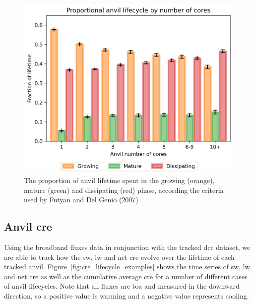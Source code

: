 \begin{figure}[tp]
    \includegraphics[width=\textwidth]{figures/ch3_09.png}
    \caption[
    The proportion of anvil lifetime spent in the growing, mature and dissipating phase
    ]{
    The proportion of anvil lifetime spent in the growing (orange), mature (green) and dissipating (red) phase, according the criteria used by Futyan and Del Genio (2007)
    }
    \label{fig:seviri_lifetime_proportions}
\end{figure}


\subsection{Anvil \acrshort{cre}}

Using the broadband fluxes data in conjunction with the tracked \acrshort{dcc}
dataset, we are able to track how the \acrshort{sw}, \acrshort{lw} and net \acrshort{cre} evolve over the
lifetime of each tracked anvil. Figure~\ref{fig:cre_lifecycle_examples} shows the time series of \acrshort{sw}, \acrshort{lw}
and net \acrshort{cre} as well as the cumulative average \acrshort{cre} for a number of
different cases of anvil lifecycles. Note that all fluxes are
\acrshort{toa} and measured in the downward direction, so a positive
value is warming and a negative value represents cooling.


